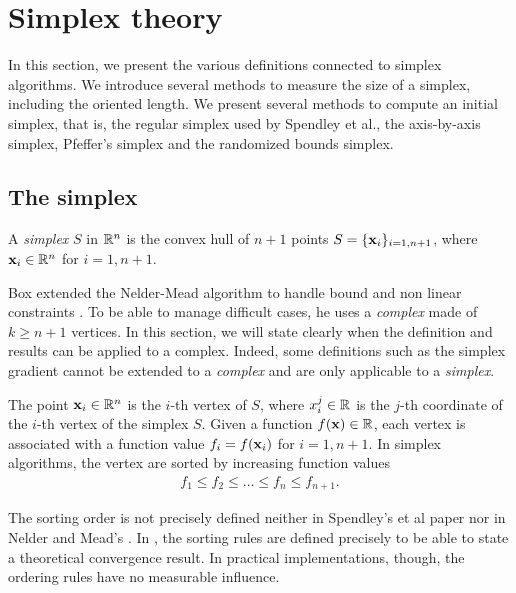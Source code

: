 \chapter{Simplex theory}

In this section, we present the various definitions connected
to simplex algorithms. We introduce several methods to measure 
the size of a simplex, including the oriented length. 
We present several methods to compute an
initial simplex, that is, the regular simplex used by Spendley et al.,
the axis-by-axis simplex, Pfeffer's simplex and the randomized 
bounds simplex.

\section{The simplex}

A \emph{simplex} $S$ in $\mathbb{R}^n$ is the convex hull of $n+1$ points $S=\{\mathbf{x}_i\}_{i=1,n+1}$,
where $\mathbf{x}_i \in \mathbb{R}^n$ for $i=1,n+1$.

Box extended the Nelder-Mead algorithm to handle bound and non linear constraints \cite{Box1965}.
To be able to manage difficult cases, he uses a \emph{complex} made of $k\geq n+1$ vertices.
In this section, we will state clearly when the definition and results can be applied to a complex. 
Indeed, some definitions such as the simplex gradient cannot be extended to a \emph{complex}
and are only applicable to a \emph{simplex}.

The point $\mathbf{x}_i\in\mathbb{R}^n$ is the $i$-th vertex of $S$,  
where $x_i^j\in\mathbb{R}$ is the $j$-th coordinate of the $i$-th vertex of the simplex $S$.
Given a function $f(\mathbf{x})\in\mathbb{R}$,
each vertex is associated with a function value $f_i = f(\mathbf{x}_i)$ for $i=1,n+1$.
In simplex algorithms, the vertex are sorted by increasing function values 
\begin{eqnarray}
\label{simplex-sortedfv}
f_1 \leq f_2 \leq \ldots \leq f_n \leq f_{n+1}.
\end{eqnarray}

The sorting order is not precisely defined neither in Spendley's et al paper \cite{Spendley1962}
nor in Nelder and Mead's \cite{citeulike:3009487}. 
In \cite{lagarias:112}, the sorting rules are defined precisely to be able to 
state a theoretical convergence result. In practical implementations, though, the 
ordering rules have no measurable influence.

